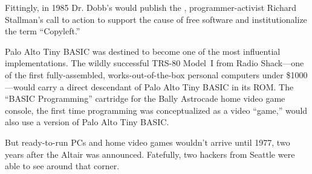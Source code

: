 \begin{tangent}
Fittingly, in 1985 Dr. Dobb's would publish the ,
programmer-activist Richard Stallman's call to action to support the
cause of free software and institutionalize the term ``Copyleft.''
\end{tangent}

Palo Alto Tiny BASIC was destined to become one of the most influential
implementations. 
The wildly successful TRS-80 Model~I from Radio Shack---one of the first 
fully-assembled, works-out-of-the-box  
personal computers under \$1000---would carry a direct descendant of
Palo Alto Tiny BASIC in its ROM.
The ``BASIC Programming'' cartridge for the Bally Astrocade
home video game console, the first time programming
was conceptualized as a video ``game,''
would also use a version of Palo Alto Tiny
BASIC.

But ready-to-run PCs and home video games wouldn't arrive until 1977,
two years after the Altair 
was announced.
Fatefully, two hackers from Seattle were able to see around that corner.


